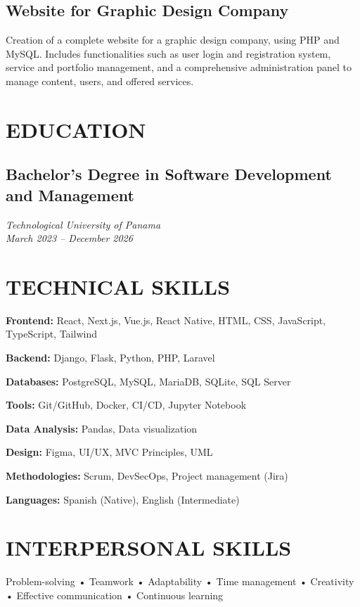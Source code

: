 \documentclass[11pt,a4paper]{article}
\begin{document}
\subsection*{Website for Graphic Design Company}
Creation of a complete website for a graphic design company, using PHP and MySQL. Includes functionalities such as user login and registration system, service and portfolio management, and a comprehensive administration panel to manage content, users, and offered services.

\section*{EDUCATION}

\subsection*{Bachelor's Degree in Software Development and Management}
\textit{Technological University of Panama}\\
\textit{March 2023 -- December 2026}

\section*{TECHNICAL SKILLS}

\textbf{Frontend:} React, Next.js, Vue.js, React Native, HTML, CSS, JavaScript, TypeScript, Tailwind

\textbf{Backend:} Django, Flask, Python, PHP, Laravel

\textbf{Databases:} PostgreSQL, MySQL, MariaDB, SQLite, SQL Server

\textbf{Tools:} Git/GitHub, Docker, CI/CD, Jupyter Notebook

\textbf{Data Analysis:} Pandas, Data visualization

\textbf{Design:} Figma, UI/UX, MVC Principles, UML

\textbf{Methodologies:} Scrum, DevSecOps, Project management (Jira)

\textbf{Languages:} Spanish (Native), English (Intermediate)

\section*{INTERPERSONAL SKILLS}

Problem-solving • Teamwork • Adaptability • Time management • Creativity • Effective communication • Continuous learning
\end{document}
